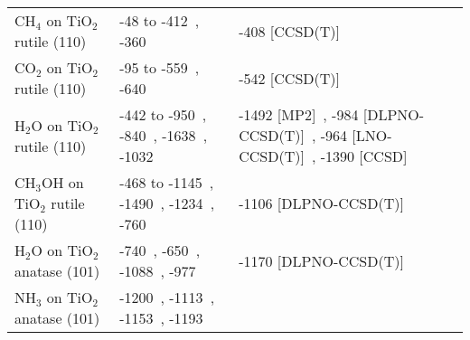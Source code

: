 \begin{table}
\begin{adjustbox}{center}
\begin{tabular}{lp{7cm}p{7cm}}
CH$_4$ on TiO$_2$ rutile (110) & -48 to -412~\cite{kubasSurfaceAdsorptionEnergetics2016c}, -360~\cite{tillotsonAdsorptionOrganicMolecules2015} & -408 [CCSD(T)]~\cite{kubasSurfaceAdsorptionEnergetics2016c} \\
CO$_2$ on TiO$_2$ rutile (110) & -95 to -559~\cite{kubasSurfaceAdsorptionEnergetics2016c}, -640~\cite{kovacicElectronicPropertiesRutile2022} & -542 [CCSD(T)]~\cite{kubasSurfaceAdsorptionEnergetics2016c} \\
H$_2$O on TiO$_2$ rutile (110) & -442 to -950~\cite{kubasSurfaceAdsorptionEnergetics2016c}, -840~\cite{liuStructureDynamicsLiquid2010b}, -1638~\cite{banduraAdsorptionWaterTiO22004a}, -1032~\cite{sorescuCoadsorptionPropertiesCO22012} & -1492 [MP2]~\cite{stefanovichInitioStudyWater1999}, -984 [DLPNO-CCSD(T)]~\cite{kubasSurfaceAdsorptionEnergetics2016c}, -964 [LNO-CCSD(T)]~\cite{yeInitioSurfaceChemistry2024}, -1390 [CCSD]~\cite{schaferLocalEmbeddingCoupled2021b} \\
CH$_3$OH on TiO$_2$ rutile (110) & -468 to -1145~\cite{kubasSurfaceAdsorptionEnergetics2016c}, -1490~\cite{kieuTrendsAdsorptionEnergy2002}, -1234~\cite{batesAdsorptionDissociationROH1998}, -760~\cite{langFirstPrinciplesStudyMethanol2014} & -1106 [DLPNO-CCSD(T)]~\cite{kubasSurfaceAdsorptionEnergetics2016c} \\
H$_2$O on TiO$_2$ anatase (101) & -740~\cite{vittadiniStructureEnergeticsWater1998}, -650~\cite{millerEffectsWaterFormic2011}, -1088~\cite{onalAdsorptionWaterAmmonia2006}, -977~\cite{zhaoStructurePropertiesWater2012} & -1170 [DLPNO-CCSD(T)]~\cite{petersenWaterAdsorptionIdeal2020} \\
NH$_3$ on TiO$_2$ anatase (101) & -1200~\cite{koustNH3AdsorptionAnataseTiO22018a}, -1113~\cite{onalAdsorptionWaterAmmonia2006}, -1153~\cite{wanbayorAdsorptionCOH22010}, -1193~\cite{changAdsorptionConfigurationDissociative2009} &  \\
\bottomrule
\end{tabular}
\end{adjustbox}

\end{table}